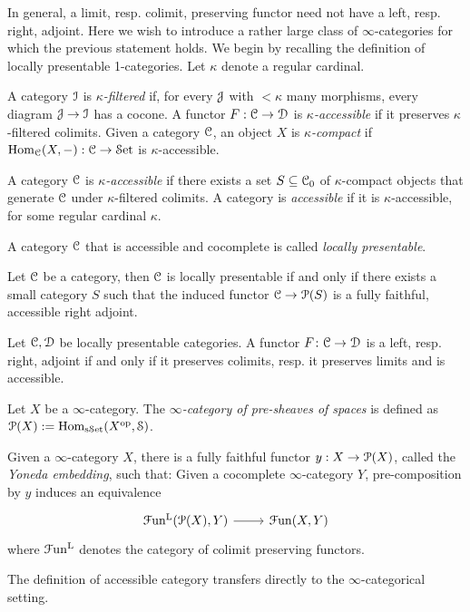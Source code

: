\documentclass[10pt]{amsart}
\numberwithin{equation}{section}
\begin{document}
In general, a limit, resp. colimit, preserving functor need not have a left, resp. right, adjoint. Here we wish to introduce a rather large class of $\infty$-categories for which the previous statement holds. We begin by recalling the definition of locally presentable 1-categories. Let $\kappa$ denote a regular cardinal. 
\begin{definition}
  A category $\mathcal{I}$ is \emph{$\kappa$-filtered} if, for every $\mathcal{J}$ with $<\kappa$ many morphisms, every diagram $\mathcal{J}\to\mathcal{I}$ has a cocone. A functor $F:\mathcal{C} \to \mathcal{D}$ is \emph{$\kappa$-accessible} if it preserves $\kappa$-filtered colimits. Given a category $\mathcal{C}$, an object $X$ is \emph{$\kappa$-compact} if $\mathrm{Hom}_{\mathcal{C}}(X,-):\mathcal{C}\to\mathcal{S}\mathrm{et}$ is $\kappa$-accessible. 
\end{definition}
\begin{definition}
  A category $\mathcal{C}$ is \emph{$\kappa$-accessible} if there exists a set $S\subseteq\mathcal{C}_0$ of $\kappa$-compact objects that generate $\mathcal{C}$ under $\kappa$-filtered colimits. A category is \emph{accessible} if it is $\kappa$-accessible, for some regular cardinal $\kappa$. 
\end{definition}
\begin{definition}
  A category $\mathcal{C}$ that is accessible and cocomplete is called \emph{locally presentable}.
\end{definition}
\begin{theorem}
  Let $\mathcal{C}$ be a category, then $\mathcal{C}$ is locally presentable if and only if there exists a small category $S$ such that the induced functor $\mathcal{C}\to\mathcal{P}(S)$ is a fully faithful, accessible right adjoint. 
\end{theorem}
\begin{theorem}
  Let $\mathcal{C},\mathcal{D}$ be locally presentable categories. A functor $F\colon \mathcal{C} \to \mathcal{D}$ is a left, resp. right, adjoint if and only if it preserves colimits, resp. it preserves limits and is accessible.
\end{theorem}
\begin{definition}
  Let $X$ be a $\infty$-category. The \emph{$\infty$-category of pre-sheaves of spaces} is defined as $\mathcal{P}(X):=\mathrm{Hom}_{\mathrm{s}\mathcal{S}\mathrm{et}}(X^{\mathrm{op}},\mathcal{S})$.
\end{definition}
\begin{theorem}[Yoneda]
  Given a $\infty$-category $X$, there is a fully faithful functor $y:X\to\mathcal{P}(X)$, called the \emph{Yoneda embedding}, such that: Given a cocomplete $\infty$-category $Y$, pre-composition by $y$ induces an equivalence \begin{equation}
    \begin{tikzcd}
      \Fun^\mL(\lP(X),Y) \arrow[r] & \Fun(X,Y)
    \end{tikzcd}
  \end{equation}where $\mathcal{F}\mathrm{un}^{\mathrm{L}}$ denotes the category of colimit preserving functors. 
\end{theorem} The definition of accessible category transfers directly to the $\infty$-categorical setting. 
\end{document}
